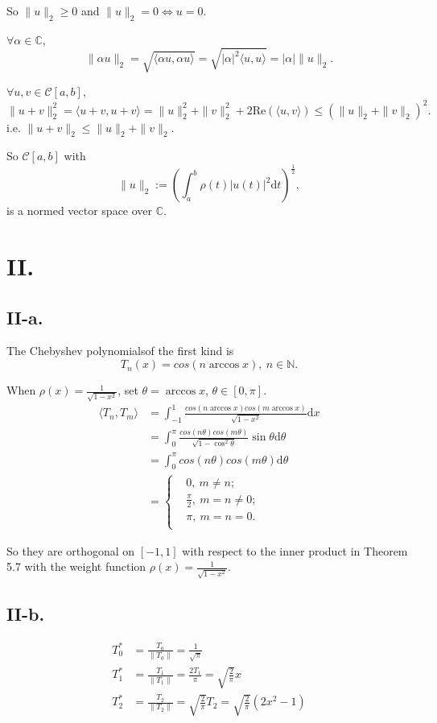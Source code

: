 \documentclass[a4paper]{article}
\begin{document}
So $\|u\|_2\geq0$ and $\|u\|_2=0\iff u=0.$

$\forall \alpha \in \mathbb{C}$, 
$$
\|\alpha u\|_2=\sqrt{\langle\alpha u,\alpha u\rangle}=\sqrt{|\alpha|^2\langle u,u\rangle}=|\alpha|\|u\|_2.
$$

$\forall u,v\in \mathcal{C}[a,b]$,
$$
\|u+v\|_2^2=\langle u+v,u+v\rangle=\|u\|_2^2+\|v\|_2^2+2\mathrm{Re}(\langle u,v\rangle)\leq(\|u\|_2+\|v\|_2)^2.
$$
i.e. $\|u+v\|_2\leq\|u\|_2+\|v\|_2$.

So $\mathcal{C}[a,b]$ with 
$$
\|u\|_2:=\left(\int_a^b\rho(t)|u(t)|^2\mathrm{d}t\right)^{\frac12},
$$
is a normed vector space over $\mathbb{C}$.

\section*{II.}
\subsection*{II-a.}
The Chebyshev polynomialsof the first kind is
$$
T_n(x)=cos(n\arccos x),\ n\in \mathbb{N}.
$$

When $\rho(x)=\frac{1}{\sqrt{1-x^2}}$, set $\theta=\arccos x$, $\theta\in [0,\pi]$.
$$
\begin{aligned}
\langle T_n,T_m\rangle&=\int_{-1}^{1}\frac{cos(n\arccos x) cos(m\arccos x)}{\sqrt{1-x^2}}\mathrm{d}x\\
&=\int_{0}^{\pi}\frac{cos(n\theta) cos(m\theta)}{\sqrt{1-\cos^2 \theta}}\sin\theta\mathrm{d}\theta\\
&=\int_{0}^{\pi}cos(n\theta) cos(m\theta)\mathrm{d}\theta\\
&=\left\{\begin{aligned}
&0, \ m\neq n;\\
&\frac{\pi}{2},\ m=n\neq0;\\
&\pi,\ m=n=0.\\
\end{aligned}
\right.
\end{aligned}
$$

So they are orthogonal on $[-1, 1]$ with respect to the inner product in Theorem 5.7 with the weight function $\rho(x)=\frac{1}{\sqrt{1-x^2}}$.

\subsection*{II-b.}
$$
\begin{aligned}
    T_0^*&=\frac{T_0}{\|T_0\|}=\frac{1}{\sqrt{\pi}}\\
    T_1^*&=\frac{T_1}{\|T_1\|}=\frac{2T_1}{\pi}=\sqrt{\frac{2}{\pi}}x\\
    T_2^*&=\frac{T_2}{\|T_2\|}=\sqrt{\frac{2}{\pi}}T_2=\sqrt{\frac{2}{\pi}}(2x^2-1)\\
\end{aligned}
$$
\end{document}
